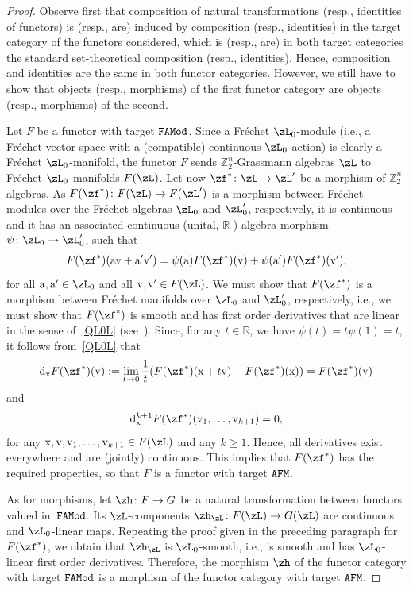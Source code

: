 \documentclass[pdftex]{sigma}%
\newcommand{\R}{{\mathbb R}}
\newcommand{\Z}{{\mathbb Z}}
\newcommand{\0}{\otimes}
\newcommand{\z}{\Z_2^n}
\numberwithin{equation}{section}
\begin{document}
\begin{proof}
Observe first that composition of natural transformations (resp., identities of functors) is (resp., are) induced by composition (resp., identities) in the target category of the functors considered, which is (resp., are) in both target categories the standard set-theoretical composition (resp., identities). Hence, composition and identities are the same in both functor categories. However, we still have to show that objects (resp., morphisms) of the first functor category are objects (resp., morphisms) of the second.

Let $F$ be a functor with target $\tt FAMod$. Since a Fr\'echet $\zL_0$-module (i.e., a Fr\'echet vector space with a (compatible) continuous $\zL_0$-action) is clearly a Fr\'echet $\zL_0$-manifold, the functor $F$ sends $\z$-Grassmann algebras $\zL$ to Fr\'echet $\zL_0$-manifolds $F(\zL)$. Let now $\zf^*\colon \zL\to \zL'$ be a morphism of $\z$-algebras. As $F(\zf^*)\colon F(\zL)\to F(\zL')$ is a morphism between Fr\'echet modules over the Fr\'echet algebras $\zL_0$ and $\zL'_0$, respectively, it is continuous and it has an associated continuous (unital, $\R$-) algebra morphism $\psi\colon \zL_0\to\zL'_0$, such that
\begin{gather}\label{QL0L}
F(\zf^*)({\rm a}{\rm v}+{\rm a}'{\rm v}')=\psi({\rm a})F(\zf^*)({\rm v})+\psi({\rm a}')F(\zf^*)({\rm v}'),
\end{gather}
for all ${\rm a,a'}\in\zL_0$ and all ${\rm v,v'}\in F(\zL)$. We must show that $F(\zf^*)$ is a morphism between Fr\'echet manifolds over $\zL_0$ and $\zL'_0$, respectively, i.e., we must show that $F(\zf^*)$ is smooth and has first order derivatives that are linear in the sense of~\eqref{QL0L} (see~\cite{Bruce:2019b}). Since, for any $t\in\R$, we have $\psi(t)=t\psi(1)=t$, it follows from~\eqref{QL0L} that
\[
{\rm d}_{\rm x}F(\zf^*)({\rm v}):=\lim_{t\to 0}\frac{1}{t}(F(\zf^*)({\rm x}+t{\rm v})-F(\zf^*)({\rm x}))=F(\zf^*)({\rm v})
\]
and
\[
{\rm d}^{k+1}_{\rm x}F(\zf^*)({\rm v}_1,\dots,{\rm v}_{k+1})=0,
\]
for any ${\rm x}, {\rm v}, {\rm v}_1,\dots, {\rm v}_{k+1}\in F(\zL)$ and any $k\ge 1$. Hence, all derivatives exist everywhere and are (jointly) continuous. This implies that $F(\zf^*)$ has the required properties, so that $F$ is a functor with target $\tt AFM$.

As for morphisms, let $\zh\colon F\to G$ be a natural transformation between functors valued in~$\tt FAMod$. Its $\zL$-components $\zh_\zL\colon F(\zL)\to G(\zL)$ are continuous and $\zL_0$-linear maps. Repeating the proof given in the preceding paragraph for $F(\zf^*)$, we obtain that $\zh_\zL$ is $\zL_0$-smooth, i.e., is smooth and has $\zL_0$-linear first order derivatives. Therefore, the morphism $\zh$ of the functor category with target $\tt FAMod$ is a morphism of the functor category with target $\tt AFM$.
\end{proof}
\end{document}
